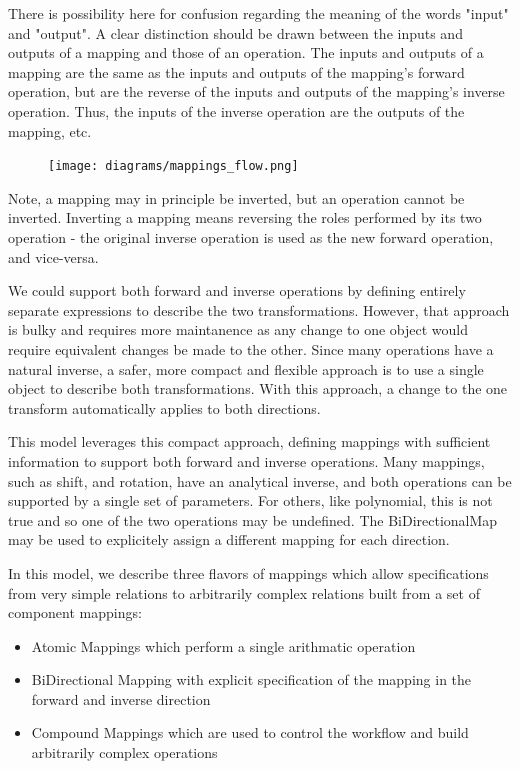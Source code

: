   There is possibility here for confusion regarding the meaning of the words "input" and "output". A clear distinction should be drawn between the inputs and outputs of a mapping and those of an operation. The inputs and outputs of a mapping are the same as the inputs and outputs of the mapping's forward operation, but are the reverse of the inputs and outputs of the mapping's inverse operation. Thus, the inputs of the inverse operation are the outputs of the mapping, etc. 

  \begin{figure}[h]
  \begin{center}
    \texttt{[image: diagrams/mappings\_flow.png]}
  \end{center}
  \end{figure}

  Note, a mapping may in principle be inverted, but an operation cannot be inverted. Inverting a mapping means reversing the roles performed by its two operation - the original inverse operation is used as the new forward operation, and vice-versa. 

  We could support both forward and inverse operations by defining entirely separate expressions to describe the two transformations. However, that approach is bulky and requires more maintanence as any change to one object would require equivalent changes be made to the other. Since many operations have a natural inverse, a safer, more compact and flexible approach is to use a single object to describe both transformations. With this approach, a change to the one transform automatically applies to both directions. 

  This model leverages this compact approach, defining mappings with sufficient information to support both forward and inverse operations. Many mappings, such as shift, and rotation, have an analytical inverse, and both operations can be supported by a single set of parameters. For others, like polynomial, this is not true and so one of the two operations may be undefined. The BiDirectionalMap may be used to explicitely assign a different mapping for each direction. 

  In this model, we describe three flavors of mappings which allow specifications from very simple relations to arbitrarily complex relations built from a set of component mappings: 
  \begin{itemize}
  \item Atomic Mappings which perform a single arithmatic operation 
  \item BiDirectional Mapping with explicit specification of the mapping in the forward and inverse direction
  \item Compound Mappings which are used to control the workflow and build arbitrarily complex operations
  \end{itemize}

